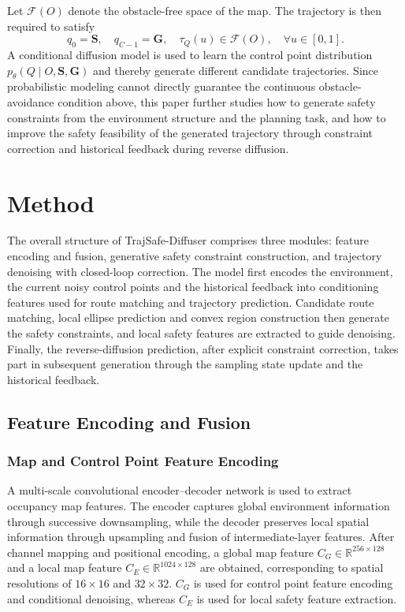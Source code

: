 \documentclass[journal]{IEEEtran}
\newcommand{\R}{\mathbb{R}}
\begin{document}
Let $\mathcal F(O)$ denote the obstacle-free space of the map. The trajectory
is then required to satisfy
\begin{equation}
q_0=\bm S,\quad q_{C-1}=\bm G,\quad
\tau_Q(u)\in\mathcal F(O),\quad \forall u\in[0,1].
\end{equation}
A conditional diffusion model is used to learn the control point distribution
$p_\theta(Q\mid O,\bm S,\bm G)$ and thereby generate different candidate
trajectories. Since probabilistic modeling cannot directly guarantee the
continuous obstacle-avoidance condition above, this paper further studies how
to generate safety constraints from the environment structure and the planning
task, and how to improve the safety feasibility of the generated trajectory
through constraint correction and historical feedback during reverse diffusion.

\section{Method}
The overall structure of TrajSafe-Diffuser comprises three modules: feature
encoding and fusion, generative safety constraint construction, and trajectory
denoising with closed-loop correction. The model first encodes the environment,
the current noisy control points and the historical feedback into conditioning
features used for route matching and trajectory prediction. Candidate route
matching, local ellipse prediction and convex region construction then generate
the safety constraints, and local safety features are extracted to guide
denoising. Finally, the reverse-diffusion prediction, after explicit constraint
correction, takes part in subsequent generation through the sampling state
update and the historical feedback.

\subsection{Feature Encoding and Fusion}

\subsubsection{Map and Control Point Feature Encoding}
A multi-scale convolutional encoder--decoder network is used to extract
occupancy map features. The encoder captures global environment information
through successive downsampling, while the decoder preserves local spatial
information through upsampling and fusion of intermediate-layer features. After
channel mapping and positional encoding, a global map feature
$C_G\in\R^{256\times128}$ and a local map feature
$C_E\in\R^{1024\times128}$ are obtained, corresponding to spatial resolutions
of $16\times16$ and $32\times32$. $C_G$ is used for control point feature
encoding and conditional denoising, whereas $C_E$ is used for local safety
feature extraction.
\end{document}
